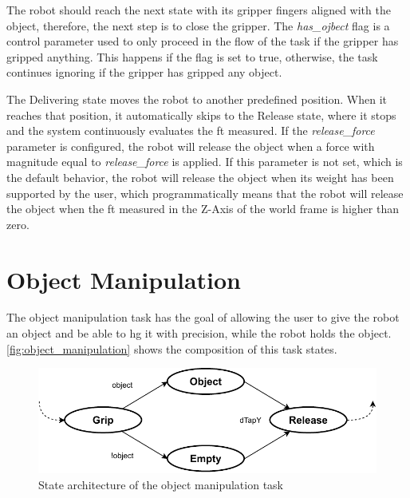 \par The robot should reach the next state with its gripper fingers aligned with the object, therefore, the next step is to close the gripper. The \textit{has\_ojbect} flag is a control parameter used to only proceed in the flow of the task if the gripper has gripped anything. This happens if the flag is set to true, otherwise, the task continues ignoring if the gripper has gripped any object.

\par The Delivering state moves the robot to another predefined position. When it reaches that position, it automatically skips to the Release state, where it stops and the system continuously evaluates the \ac{ft} measured. If the \textit{release\_force} parameter is configured, the robot will release the object when a force with magnitude equal to \textit{release\_force} is applied. If this parameter is not set, which is the default behavior, the robot will release the object when its weight has been supported by the user, which programmatically means that the robot will release the object when the \ac{ft} measured in the Z-Axis of the world frame is higher than zero. 






\section{Object Manipulation}


\par The object manipulation task has the goal of allowing the user to give the robot an object and be able to \ac{hg} it with precision, while the robot holds the object. \autoref{fig:object_manipulation} shows the composition of this task states.

\begin{figure}[h]
    \centering
    \includegraphics[width=0.7\linewidth]{figs/chp5/object_manipulation.pdf}
    \caption{State architecture of the object manipulation task}
    \label{fig:object_manipulation}
\end{figure}

